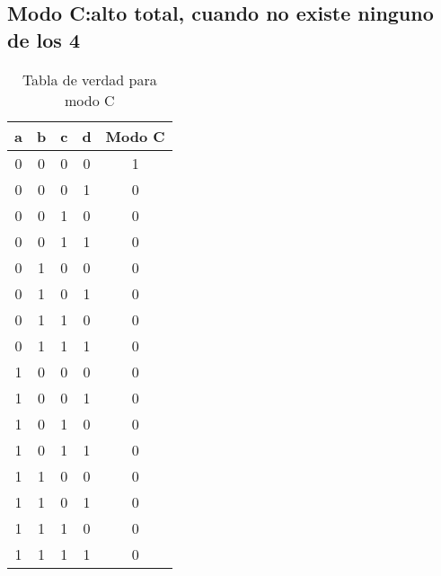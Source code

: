 \subsection{Modo C:alto total, cuando no existe ninguno de los 4}
\begin{table}[!ht]
    \centering
    \begin{tabular}{|c|c|c|c|c|}
        \hline
        a & b & c & d & Modo C \\
        \hline
        0 & 0 & 0 & 0 & 1 \\
        \hline
        0 & 0 & 0 & 1 & 0 \\
        \hline
        0 & 0 & 1 & 0 & 0 \\
        \hline
        0 & 0 & 1 & 1 & 0 \\
        \hline
        0 & 1 & 0 & 0 & 0 \\
        \hline
        0 & 1 & 0 & 1 & 0 \\
        \hline
        0 & 1 & 1 & 0 & 0 \\
        \hline
        0 & 1 & 1 & 1 & 0 \\
        \hline
        1 & 0 & 0 & 0 & 0 \\
        \hline
        1 & 0 & 0 & 1 & 0 \\
        \hline
        1 & 0 & 1 & 0 & 0 \\
        \hline
        1 & 0 & 1 & 1 & 0 \\
        \hline
        1 & 1 & 0 & 0 & 0 \\
        \hline
        1 & 1 & 0 & 1 & 0 \\
        \hline
        1 & 1 & 1 & 0 & 0 \\
        \hline
        1 & 1 & 1 & 1 & 0 \\
        \hline        
    \end{tabular}
    \caption{Tabla de verdad para modo C}\label{table:modo-C}
\end{table}